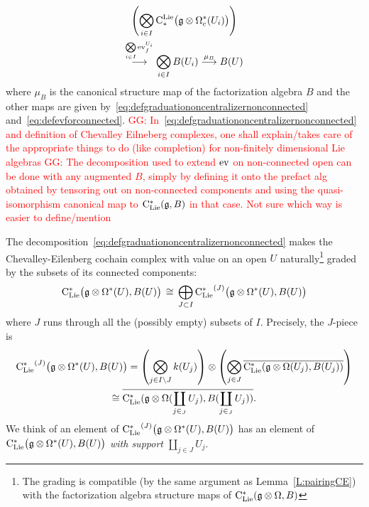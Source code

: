 \documentclass[11pt]{amsart}
\numberwithin{equation}{section}
\def\greg{\textcolor{red}{GG: }\textcolor{red}}
\begin{document}
{\begin{multline}
 \left(\bigotimes\limits_{i\in I}{\rm C}^{\rm Lie}_*\big(\mathfrak g \otimes \Omega_c^* (U_i)\big)\right)  \\ 
 \stackrel{\bigotimes\limits_{i\in I}{\rm ev}^{U_i}_f}\longrightarrow  
 \bigotimes\limits_{i\in I} B(U_i) \stackrel{\mu_B}\longrightarrow B(U)
\end{multline}
where $\mu_B$ is the canonical structure map of the factorization algebra $B$ and the other maps are given by~\eqref{eq:defgraduationoncentralizernonconnected} 
and~\eqref{eq:defevforconnected}.
\greg{In~\eqref{eq:defgraduationoncentralizernonconnected} and definition of Chevalley Eilneberg complexes, one shall explain/takes care of the appropriate 
things to do (like completion) for non-finitely dimensional Lie algebras}
\greg{The decomposition used to extend ${\rm ev}$ on non-connected open can be done with any augmented $B$, simply by defining it onto the prefact alg obtained by tensoring 
out on non-connected components and using the quasi-isomorphism canonical map to ${\rm C}_{\rm Lie}^*(\mathfrak g, B)$ in that case. Not sure which way is easier to define/mention}\\
\begin{rmk}\label{Rmk:defgraduationclie} The decomposition~\eqref{eq:defgraduationoncentralizernonconnected} makes 
the Chevalley-Eilenberg cochain complex with value on an open $U$ naturally\footnote{The grading
is compatible (by the same argument as Lemma~\ref{L:pairingCE}) with the factorization algebra structure maps of
${\rm C}_{\rm Lie}^*(\mathfrak g\otimes \Omega, B)$} graded by the subsets of its connected components:
 \begin{equation}\label{eq:defgraduationoncentralizernonconnected2}
 {\rm C}_{\rm Lie}^*\big(\mathfrak g\otimes \Omega^*(U), B(U)\big)  \, \cong \, \bigoplus\limits_{J\subset I} {{\rm C}_{\rm Lie}^*}^{(J)}\big(\mathfrak g\otimes \Omega^*(U), B(U)\big) 
\end{equation}
where $J$ runs through all the (possibly empty) subsets of $I$.  Precisely, the $J$-piece is
\begin{multline*}
{{\rm C}_{\rm Lie}^*}^{(J)}\big(\mathfrak g\otimes \Omega^*(U), B(U)\big) = 
\left(\bigotimes\limits_{j\in I\setminus J} k(U_j)\right) \otimes \left(\bigotimes\limits_{j\in J}
\overline{{\rm C}_{\rm Lie}^* (\mathfrak g\otimes \Omega (U_j), B(U_j))  }\right) \\ \cong 
\overline{{\rm C}_{\rm Lie}^* (\mathfrak g\otimes \Omega (\coprod\limits_{j\in_J}U_j), B(\coprod\limits_{j\in_J}U_j))  }.
\end{multline*}
We think of an element of ${{\rm C}_{\rm Lie}^*}^{(J)}\big(\mathfrak g\otimes \Omega^*(U), B(U)\big)$ has an element of ${{\rm C}_{\rm Lie}^*}\big(\mathfrak g\otimes \Omega^*(U), B(U)\big)$
\emph{with support $\coprod\limits_{j\in J} U_j$}.   

\end{rmk}}
\end{document}
